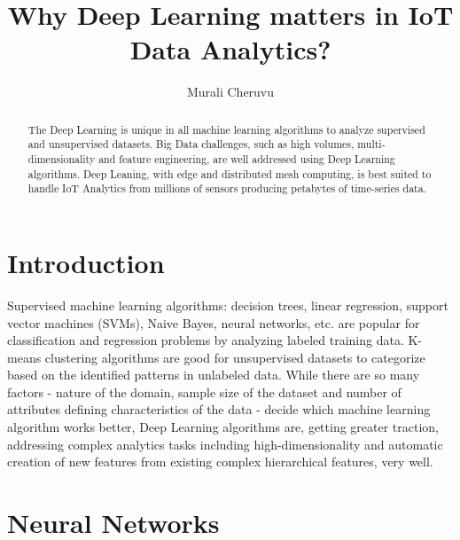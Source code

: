 \documentclass[sigconf]{acmart}
\begin{document}
	\title{Why Deep Learning matters in IoT Data Analytics?}
	
	
	\author{Murali Cheruvu}
	
	\renewcommand{\shortauthors}{M. Cheruvu}
	
	
	\begin{abstract}
		
	The Deep Learning is unique in all machine learning algorithms to analyze supervised and unsupervised datasets. Big Data challenges, such as high volumes, multi-dimensionality and feature engineering, are well addressed using Deep Learning algorithms. Deep Leaning, with edge and distributed mesh computing, is best suited to handle IoT Analytics from millions of sensors producing petabytes of time-series data.
			
	\end{abstract}
	
	
	\maketitle

	
	\section{Introduction}		

	Supervised machine learning algorithms: decision trees, linear regression, support vector machines (SVMs), Naive Bayes, neural networks, etc. are popular for classification and regression problems by analyzing labeled training data. K-means clustering algorithms are good for unsupervised datasets to categorize based on the identified patterns in unlabeled data. While there are so many factors - nature of the domain, sample size of the dataset and number of attributes defining characteristics of the data - decide which machine learning algorithm works better, Deep Learning algorithms are, getting greater traction, addressing complex analytics tasks including high-dimensionality and automatic creation of new features from existing complex hierarchical features, very well. 
		
	\section{Neural Networks}
\end{document}
